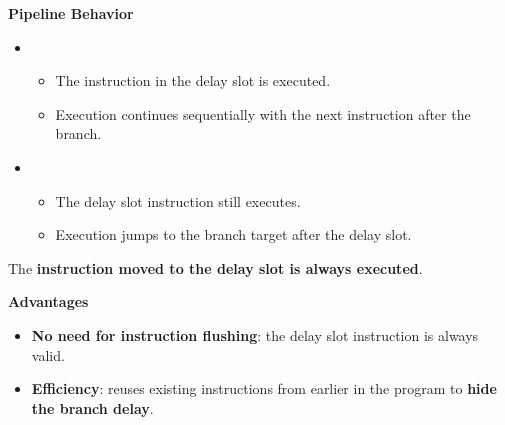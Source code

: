 \begin{flushleft}
    \textcolor{Green3}{ \textbf{Pipeline Behavior}}
\end{flushleft}
\begin{itemize}
    \item {}
    \begin{itemize}
        \item The instruction in the delay slot is executed.
        \item Execution continues sequentially with the next instruction after the branch.
    \end{itemize}

    \item {}
    \begin{itemize}
        \item The delay slot instruction still executes.
        \item Execution jumps to the branch target after the delay slot.
    \end{itemize}
\end{itemize}
The \textbf{instruction moved to the delay slot is always executed}.

\highspace
\begin{flushleft}
    \textcolor{Green3}{ \textbf{Advantages}}
\end{flushleft}
\begin{itemize}[label=\textcolor{Green3}{}]
    \item \textcolor{Green3}{\textbf{No need for instruction flushing}}: the delay slot instruction is always valid.
    \item \textcolor{Green3}{\textbf{Efficiency}}: reuses existing instructions from earlier in the program to \textbf{hide the branch delay}.
\end{itemize}